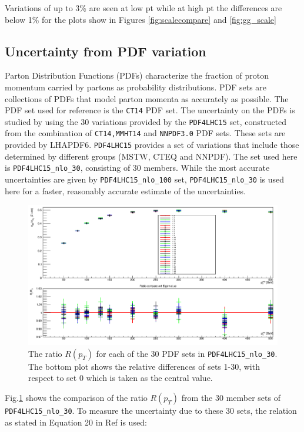 \documentclass[11pt,a4paper]{report}
\begin{document}
Variations of up to 3\% are seen at low pt while at high pt the differences are below 1\% for the plots show in Figures \ref{fig:scalecompare} and \ref{fig:gg_scale}

\subsection{Uncertainty from PDF variation}
Parton Distribution Functions (PDFs) characterize the fraction of proton momentum carried by partons as probability distributions. PDF sets are collections of PDFs that model parton momenta as accurately as possible. The PDF set used for reference is the \texttt{CT14}\cite{CT14} PDF set. The uncertainty on the PDFs is studied by using the 30 variations provided by the \texttt{PDF4LHC15} set\cite{PDF4}, constructed from the combination of \texttt{CT14,MMHT14}\cite{MMHT14} and \texttt{NNPDF3.0}\cite{NNPDF3} PDF sets. These sets are provided by LHAPDF6\cite{LHAPDF}. \texttt{PDF4LHC15} provides a set of variations that include those determined by different groups (MSTW, CTEQ and NNPDF). The set used here is \texttt{PDF4LHC15\_nlo\_30}, consisting of 30 members. While the most accurate uncertainties are given by \texttt{PDF4LHC15\_nlo\_100} set, \texttt{PDF4LHC15\_nlo\_30} is used here for a faster, reasonably accurate estimate of the uncertainties.
\begin{figure}[H]
\centering
	\includegraphics[width = 0.8\linewidth]{PDF4_30_overlay.png}
	\caption{The ratio $R(p_T)$ for each of the 30 PDF sets in \texttt{PDF4LHC15\_nlo\_30}. The bottom plot shows the relative differences of sets 1-30, with respect to set 0 which is taken as the central value.}
	\label{fig:PDF30var}
\end{figure}
\noindent Fig.\ref{fig:PDF30var} shows the comparison of the ratio $R(p_T)$ from the 30 member sets of \texttt{PDF4LHC15\_nlo\_30}. To measure the uncertainty due to these 30 sets, the relation as stated in Equation 20 in Ref \cite{PDF4} is used:
\end{document}
